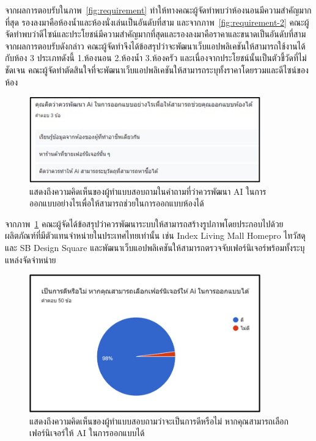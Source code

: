 \documentclass[12pt,oneside,openright,a4paper]{cpe-thai-project}
\begin{document}
\hspace {18pt} จากผลการตอบรับในภาพ~\ref{fig:requirement} ทำให้ทางคณะผู้จัดทำพบว่าห้องนอนมีความสำคัญมากที่สุด รองลงมาคือห้องน้ำและห้องนั่งเล่นเป็นอันดับที่สาม และจากภาพ~\ref{fig:requirement-2} คณะผู้จัดทำพบว่าดีไซน์และประโยชน์มีความสำคัญมากที่สุดและรองลงมาคือราคาและขนาดเป็นอันดับที่สาม จากผลการตอบรับดังกล่าว คณะผู้จัดทำจึงได้ข้อสรุปว่าจะพัฒนาเว็บแอปพลิเคชันให้สามารถใช้งานได้กับห้อง 3 ประเภทดังนี้ 1.ห้องนอน 2.ห้องน้ำ 3.ห้องครัว และเนื่องจากประโยชน์นั้นเป็นตัวชี้วัดที่ไม่ชัดเจน คณะผู้จัดทำตัดสินใจที่จะพัฒนาเว็บแอปพลิเคชันให้สามารถระบุทั้งราคาโดยรวมและดีไซน์ของห้อง

\vspace{\fill}\clearpage

\begin{figure}[!h]\centering
\includegraphics[width=10cm]{image/requirement-3.jpg}
\caption{แสดงถึงความคิดเห็นของผู้ทำแบบสอบถามในคำถามที่ว่าควรพัฒนา AI ในการออกแบบอย่างไรเพื่อให้สามารถช่วยในการออกแบบห้องได้}
\label{fig:requirement-3}
\end{figure}

\hspace {18pt}จากภาพ~\ref{fig:requirement-3} คณะผู้จัดได้ข้อสรุปว่าควรพัฒนาระบบให้สามารถสร้างรูปภาพโดยประกอบไปด้วยผลิตภัณฑ์ที่มีตัวแทนจำหน่ายในประเทศไทยเท่านั้น เช่น Index Living Mall Homepro ไทวัสดุ และ SB Design Square และพัฒนาเว็บแอปพลิเคชันให้สามารถตรวจจับเฟอร์นิเจอร์พร้อมทั้งระบุแหล่งจัดจำหน่าย

\begin{figure}[!h]\centering
\includegraphics[width=10cm]{image/requirement-4.jpg}
\caption{แสดงถึงความคิดเห็นของผู้ทำแบบสอบถามว่าจะเป็นการดีหรือไม่ หากคุณสามารถเลือกเฟอร์นิเจอร์ให้ AI ในการออกแบบได้}
\label{fig:requirement-4}
\end{figure}
\end{document}
